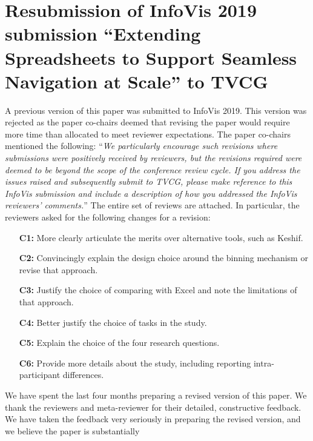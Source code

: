 

\section*{Resubmission of InfoVis 2019 submission ``Extending Spreadsheets to Support Seamless
Navigation at Scale'' to TVCG}

A previous version of this paper was submitted to InfoVis 2019. This version was rejected as the paper co-chairs deemed that revising the paper would require more time than allocated to meet reviewer expectations. The paper co-chairs mentioned the following: ``\textit{We particularly encourage such revisions where submissions were positively received by reviewers, but the revisions required were deemed to be beyond the scope of the conference review cycle. If you address the issues raised and subsequently submit to TVCG, please make reference to this  InfoVis submission and include a description of how you addressed the InfoVis reviewers' comments.}'' The entire set of reviews are attached. In particular, the reviewers asked for the following changes for a revision: 
\begin{itemize}
    \item[\textbf{C1:}] More clearly articulate the merits over alternative tools, such as Keshif. 
     \item[\textbf{C2:}] Convincingly explain the design choice around the binning mechanism or revise
    that approach.
    \item[\textbf{C3:}] Justify the choice of comparing with Excel and note the limitations of that
    approach.
     \item[\textbf{C4:}] Better justify the choice of tasks in the study. 
     \item[\textbf{C5:}] Explain the choice of the four research questions.
     \item[\textbf{C6:}] Provide more details about the study, including reporting intra-participant
    differences.
\end{itemize} 
We have spent the last four months 
preparing a revised version of this paper. We thank the reviewers and meta-reviewer for their detailed,
constructive feedback. 
We have taken the feedback very seriously in preparing
the revised version, and we believe the paper is substantially
